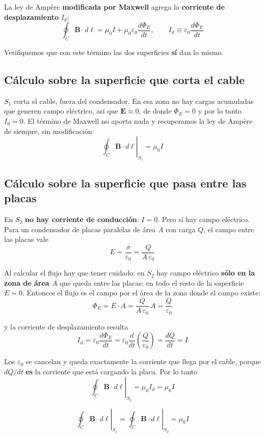 \documentclass[12pt,a4paper]{article}
\begin{document}
La ley de Ampère \textbf{modificada por Maxwell} agrega la \textbf{corriente
de desplazamiento} $I_d$:
\[
\oint_C \mathbf{B}\cdot d\boldsymbol{\ell}
  = \mu_0 I + \mu_0\varepsilon_0 \frac{d\Phi_E}{dt},
\qquad
I_d \equiv \varepsilon_0\frac{d\Phi_E}{dt}
\]

Verifiquemos que con este término las dos superficies \textbf{sí} dan lo
mismo.

\subsection{Cálculo sobre la superficie que corta el cable}

$S_1$ corta el cable, fuera del condensador. En esa zona no hay cargas
acumuladas que generen campo eléctrico, así que $\mathbf{E} \approx 0$, de
donde $\Phi_E = 0$ y por lo tanto $I_d = 0$. El término de Maxwell no aporta
nada y recuperamos la ley de Ampère de siempre, sin modificación:
\[
\left.\oint_C \mathbf{B}\cdot d\boldsymbol{\ell}\right|_{S_1} = \mu_0 I
\]

\subsection{Cálculo sobre la superficie que pasa entre las placas}

En $S_2$ \textbf{no hay corriente de conducción}: $I = 0$. Pero sí hay campo
eléctrico. Para un condensador de placas paralelas de área $A$ con carga $Q$,
el campo entre las placas vale
\[
E = \frac{\sigma}{\varepsilon_0} = \frac{Q}{A\,\varepsilon_0}
\]

Al calcular el flujo hay que tener cuidado: en $S_2$ hay campo eléctrico
\textbf{sólo en la zona de área $A$} que queda entre las placas; en todo el
resto de la superficie $E = 0$. Entonces el flujo es el campo por el área de
la zona donde el campo existe:
\[
\Phi_E = E \cdot A = \frac{Q}{A\,\varepsilon_0}\, A = \frac{Q}{\varepsilon_0}
\]

y la corriente de desplazamiento resulta
\[
I_d = \varepsilon_0\frac{d\Phi_E}{dt}
    = \varepsilon_0\frac{d}{dt}\!\left(\frac{Q}{\varepsilon_0}\right)
    = \frac{dQ}{dt} = I
\]

Los $\varepsilon_0$ se cancelan y queda exactamente la corriente que llega
por el cable, porque $dQ/dt$ \textbf{es} la corriente que está cargando la
placa. Por lo tanto
\[
\left.\oint_C \mathbf{B}\cdot d\boldsymbol{\ell}\right|_{S_2}
  = \mu_0 I_d = \mu_0 I
\]

\begin{keybox}
\[
\boxed{\
\left.\oint_C \mathbf{B}\cdot d\boldsymbol{\ell}\right|_{S_1}
= \left.\oint_C \mathbf{B}\cdot d\boldsymbol{\ell}\right|_{S_2}
= \mu_0 I\ }
\]
\end{keybox}
\end{document}
